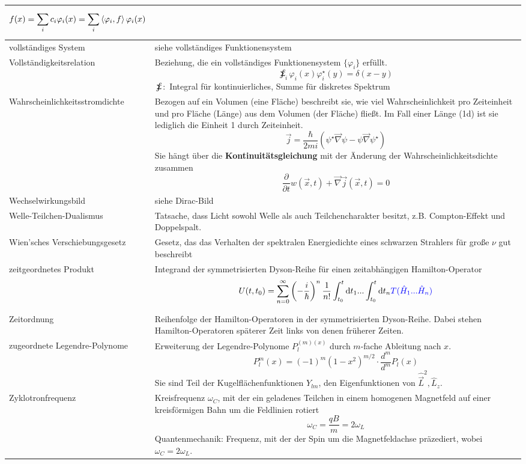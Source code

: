 \documentclass{article}
\newcommand{\diff}{\mathrm{d}}
\newcommand{\lr}[1]{\left(#1\right)}
\begin{document}
\begin{xltabular}{\linewidth}{l|X}
			$$f(x) = \sum_i c_i \varphi_i(x) = \sum_i \braket{\varphi_i, f} \varphi_i(x)$$\\
	\hline
		vollständiges System & siehe vollständiges Funktionensystem \\
	\hline
		Vollständigkeitsrelation & Beziehung, die ein vollständiges Funktionensystem $\{\varphi_i\}$ erfüllt.
			$$\sumint_i \varphi_i(x) \varphi_i^\star(y) = \delta(x - y)$$
		\textcolor{gruen}{$\sumint:$ Integral für kontinuierliches, Summe für diskretes Spektrum}\\
	\hline
		Wahrscheinlichkeitsstromdichte & Bezogen auf ein Volumen (eine Fläche) beschreibt sie, wie viel Wahrscheinlichkeit pro Zeiteinheit und pro Fläche (Länge) aus dem Volumen (der Fläche) fließt. Im Fall einer Länge (1d) ist sie lediglich die Einheit 1 durch Zeiteinheit.
			$$\vec{j} = \frac{\hbar}{2mi}(\psi^\star \vec{\nabla} \psi - \psi \vec{\nabla}\psi^\star)$$
		Sie hängt über die \textbf{Kontinuitätsgleichung} mit der Änderung der Wahrscheinlichkeitsdichte zusammen
			$$\frac{\partial}{\partial t}w(\vec{x},t) + \vec{\nabla}\vec{j}(\vec{x},t) = 0$$ \\
	\hline
		Wechselwirkungsbild & siehe Dirac-Bild \\
	\hline
		Welle-Teilchen-Dualismus & Tatsache, dass Licht sowohl Welle als auch Teilchencharakter besitzt, z.B. Compton-Effekt und Doppelspalt. \\
	\hline
		Wien'sches Verschiebungsgesetz & Gesetz, das das Verhalten der spektralen Energiedichte eines schwarzen Strahlers für große $\nu$ gut beschreibt \\
	\hline
		zeitgeordnetes Produkt & Integrand der symmetrisierten Dyson-Reihe für einen zeitabhängigen Hamilton-Operator
			$$U(t,t_0) = \sum_{n=0}^\infty \lr{-\frac{i}{\hbar}}^n \frac{1}{n!} \int_{t_0}^t \diff t_1 ... \int_{t_0}^t \diff t_n \color{blue}{T(\hat{H}_1 ... \hat{H}_n)}$$ \\
	\hline
		Zeitordnung & Reihenfolge der Hamilton-Operatoren in der symmetrisierten Dyson-Reihe. Dabei stehen Hamilton-Operatoren späterer Zeit links von denen früherer Zeiten. \\
	\hline
		zugeordnete Legendre-Polynome & Erweiterung der Legendre-Polynome $P_l^{(m)(x)}$ durch $m$-fache Ableitung nach $x$. 
			$$P_l^m(x) = (-1)^m (1 - x^2)^{m/2} \cdot \frac{d^m}{d^m} P_l(x)$$
		Sie sind Teil der Kugelflächenfunktionen $Y_{lm}$, den Eigenfunktionen von $\hat{\vec{L}}^2, \hat{L}_z$. \\
	\hline
		Zyklotronfrequenz & Kreisfrequenz $\omega_C$, mit der ein geladenes Teilchen in einem homogenen Magnetfeld auf einer kreisförmigen Bahn um die Feldlinien rotiert
			$$\omega_C = \frac{qB}{m} = 2\omega_L$$
		Quantenmechanik: Frequenz, mit der der Spin um die Magnetfeldachse präzediert, wobei $\omega_C = 2\omega_L$. \\
	\hline\hline
\end{xltabular}
\end{document}
